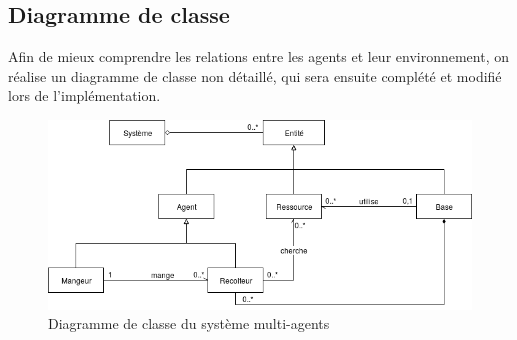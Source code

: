 \documentclass{article}
\begin{document}
\newpage
\subsection{Diagramme de classe}
Afin de mieux comprendre les relations entre les agents et leur environnement, on
réalise un diagramme de classe non détaillé, qui sera ensuite complété et modifié
lors de l'implémentation.

\begin{figure}[!ht]
  \centering
  \caption{Diagramme de classe du système multi-agents}
  \includegraphics[scale=0.70]{img/class_agents.png}
\end{figure}
\end{document}
